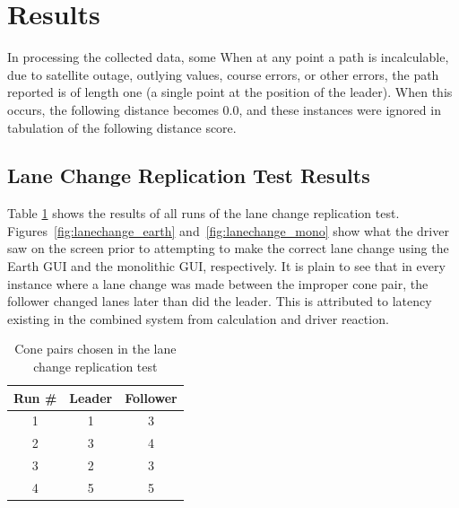 \section{Results} \label{sec:results}

In processing the collected data, some
When at any point a path is incalculable, due to satellite outage, outlying values, course errors, or other errors, the path reported is of length one (a single point at the position of the leader). When this occurs, the following distance becomes 0.0, and these instances were ignored in tabulation of the following distance score.


\subsection{Lane Change Replication Test Results} \label{sec:lanechangetestresults}

Table \ref{tab:lanechangeresults} shows the results of all runs of the lane change replication test. Figures~\ref{fig:lanechange_earth} and~\ref{fig:lanechange_mono} show what the driver saw on the screen prior to attempting to make the correct lane change using the Earth GUI and the monolithic GUI, respectively.
It is plain to see that in every instance where a lane change was made between the improper cone pair, the follower changed lanes later than did the leader. This is attributed to latency existing in the combined system from calculation and driver reaction.

\begin{table}[htbp] \centering \caption{Cone pairs chosen in the lane change replication test}
\begin{tabular}{c|cc} 
    Run \#  &     Leader&    Follower \\ \hline\hline
    1       &       1   &    3 \\
    2       &       3   &    4   \\
    3       &       2   &    3   \\
    4       &       5   &    5 \\ \hline   
\end{tabular} \label{tab:lanechangeresults} \end{table}

